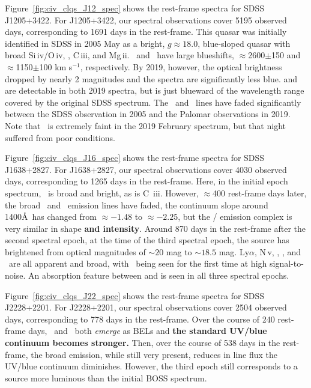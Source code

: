 \documentclass[fleqn,usenatbib]{mnras}
\begin{document}
Figure~\ref{fig:civ_clqs_J12_spec} shows the rest-frame spectra for SDSS J1205+3422.
For J1205+3422, our spectral observations cover 5195 observed days,
corresponding to 1691 days in the rest-frame. This quasar was
initially identified in SDSS in 2005 May as a bright, $g \approx
18.0$, blue-sloped quasar with broad Si\,{\sc iv}/O\,{\sc iv}, \civ,
C\,{\sc iii}, and Mg\,{\sc ii}. \ciii\ and \civ\ have large
blueshifts, $\approx$2600$\pm$150 and $\approx$1150$\pm$100 km s$^{-1}$,
respectively.  By 2019, however, the optical brightness dropped by
nearly 2 magnitudes and the spectra are significantly less blue.  \lya
and \nv are detectable in both 2019 spectra, but is just blueward of
the wavelength range covered by the original SDSS spectrum. The \civ\
and \ciii\ lines have faded significantly between the SDSS observation
in 2005 and the Palomar observations in 2019.  Note that \civ\ is
extremely faint in the 2019 February spectrum, but that night suffered
from poor conditions.

Figure~\ref{fig:civ_clqs_J16_spec} shows the rest-frame spectra for SDSS J1638+2827.
For J1638+2827, our spectral observations cover 4030 observed days,
corresponding to 1265 days in the rest-frame. Here, in the initial
epoch spectrum, \civ\ is broad and bright, as is C\,{\sc
iii}. However, $\approx$400 rest-frame days later, the broad \civ\ and
\ciii\ emission lines have faded, the continuum slope around 1400\AA\
has changed from $\approx-1.48$ to $\approx-2.25$, but the \lya/\nv
emission complex is very similar in shape {\bf and intensity}. Around
870 days in the rest-frame after the second spectral epoch, at the
time of the third spectral epoch, the source has brightened from
optical magnitudes of $\sim 20$ mag to $\sim 18.5$ mag. Ly$\alpha$,
N\,{\sc v}, \civ, \ciii, and \mgii\ are all apparent and broad, with
\mgii\ being seen for the first time at high signal-to-noise. An
absorption feature between \lya and \nv is seen in all three spectral
epochs.

Figure~\ref{fig:civ_clqs_J22_spec} shows the rest-frame spectra for SDSS J2228+2201.
For J2228+2201, our spectral observations cover 2504 observed days,
corresponding to 778 days in the rest-frame. Over the course of 240
rest-frame days, \civ\ and \ciii\ both {\it emerge} as BELs and {\bf the
standard UV/blue continuum becomes stronger.}  Then, over the
course of 538 days in the rest-frame, the broad emission, while still
very present, reduces in line flux the UV/blue continuum diminishes.
However, the third epoch still corresponds to a source more luminous
than the initial BOSS spectrum.
\end{document}
